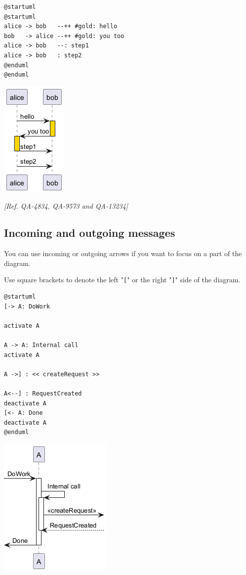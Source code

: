 \begin{verbatim}
@startuml
@startuml
alice -> bob   --++ #gold: hello
bob   -> alice --++ #gold: you too
alice -> bob   --: step1
alice -> bob   : step2
@enduml
@enduml
\end{verbatim}
\begin{center}
\includegraphics[scale=0.60]{imgw/img-5fce03de23461ed26a1508bc3f77ff5f.png}
\end{center}


\textit{[Ref. QA-4834, QA-9573 and QA-13234]}
%
%
\subsection{Incoming and outgoing messages}


You can use incoming or outgoing arrows if you want to focus on a part
of the diagram.


Use square brackets to denote the left "\texttt{[}" or the
right "\texttt{]}" side of the diagram.
\begin{verbatim}
@startuml
[-> A: DoWork

activate A

A -> A: Internal call
activate A

A ->] : << createRequest >>

A<--] : RequestCreated
deactivate A
[<- A: Done
deactivate A
@enduml
\end{verbatim}
\begin{center}
\includegraphics[scale=0.60]{imgw/img-63fc04692eb5b25a273398ea3077ef76.png}
\end{center}




